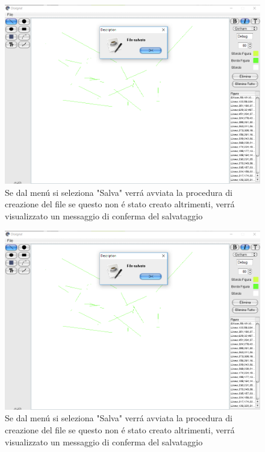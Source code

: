 \documentclass[a4paper,12pt,times,numbered,print,index]{article}
\begin{document}
\begin{figure}[3]
  \includegraphics[scale=.5]{Immagini/Debug/test4.png}
  \caption[Salvataggio file]{Se dal menú si seleziona "Salva" verrá avviata la procedura di creazione del file se questo non é stato creato altrimenti, verrá visualizzato un messaggio di conferma del salvataggio}
\end{figure}

\begin{figure}[4]
  \includegraphics[scale=.5]{Immagini/Debug/test4.png}
  \caption[Salvataggio file]{Se dal menú si seleziona "Salva" verrá avviata la procedura di creazione del file se questo non é stato creato altrimenti, verrá visualizzato un messaggio di conferma del salvataggio}
\end{figure}
\end{document}
